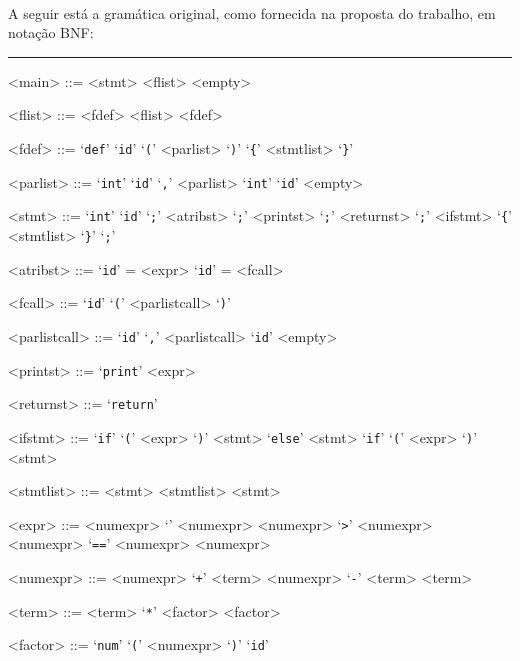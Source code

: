 \documentclass[12pt]{article}
\begin{document}
\paragraph{}
A seguir está a gramática original, como fornecida na proposta do trabalho, em notação BNF:

\noindent\rule{\textwidth}{0.2pt}

\begin{multicols}{2}
\raggedcolumns
\setlength{\columnseprule}{0.2pt}
\begin{grammar}
<main> ::= <stmt>
  \alt <flist>
  \alt <empty>

<flist> ::= <fdef> <flist>
  \alt <fdef>

<fdef> ::= ‘\texttt{def}’ ‘\texttt{id}’ ‘\texttt{(}’ <parlist> ‘\texttt{)}’ ‘\texttt{\{}’ <stmtlist> ‘\texttt{\}}’

<parlist> ::= ‘\texttt{int}’ ‘\texttt{id}’ ‘\texttt{,}’ <parlist>
  \alt ‘\texttt{int}’ ‘\texttt{id}’
  \alt <empty>

<stmt> ::= ‘\texttt{int}’ ‘\texttt{id}’ ‘\texttt{;}’
  \alt <atribst> ‘\texttt{;}’
  \alt <printst> ‘\texttt{;}’
  \alt <returnst> ‘\texttt{;}’
  \alt <ifstmt>
  \alt ‘\texttt{\{}’ <stmtlist> ‘\texttt{\}}’
  \alt ‘\texttt{;}’

<atribst> ::= ‘\texttt{id}’ = <expr>
  \alt ‘\texttt{id}’ = <fcall>

<fcall> ::= ‘\texttt{id}’ ‘\texttt{(}’ <parlistcall> ‘\texttt{)}’

<parlistcall> ::= ‘\texttt{id}’ ‘\texttt{,}’ <parlistcall>
  \alt ‘\texttt{id}’
  \alt <empty>

<printst> ::= ‘\texttt{print}’ <expr>

<returnst> ::= ‘\texttt{return}’

<ifstmt> ::= ‘\texttt{if}’ ‘\texttt{(}’ <expr> ‘\texttt{)}’ <stmt> ‘\texttt{else}’ <stmt>
  \alt ‘\texttt{if}’ ‘\texttt{(}’ <expr> ‘\texttt{)}’ <stmt>

<stmtlist> ::= <stmt> <stmtlist>
  \alt <stmt>

<expr> ::= <numexpr> ‘\texttt{}’ <numexpr>
  \alt <numexpr> ‘\texttt{>}’ <numexpr>
  \alt <numexpr> ‘\texttt{==}’ <numexpr>
  \alt <numexpr>

<numexpr> ::= <numexpr> ‘\texttt{+}’ <term>
  \alt <numexpr> ‘\texttt{-}’ <term>
  \alt <term>

<term> ::= <term> ‘\texttt{*}’ <factor>
  \alt <factor>

<factor> ::= ‘\texttt{num}’
  \alt ‘\texttt{(}’ <numexpr> ‘\texttt{)}’
  \alt ‘\texttt{id}’
\end{grammar}
\end{multicols}
\end{document}
